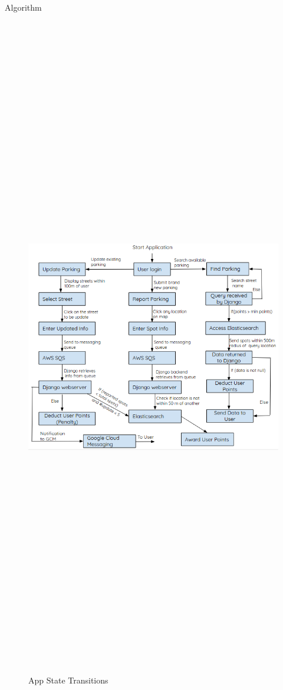 \documentclass[final]{beamer}
\newlength{\onecolwid}
\begin{document}
\begin{frame}[t]
\begin{columns}[t]
\begin{column}{\onecolwid}
\begin{block}{Algorithm}
\begin{figure}
\includegraphics[width=28cm,height=35cm]{algorithm.png}
\caption{App State Transitions}
\end{figure}


\end{block}
\end{column}
\end{columns}
\end{frame}
\end{document}
